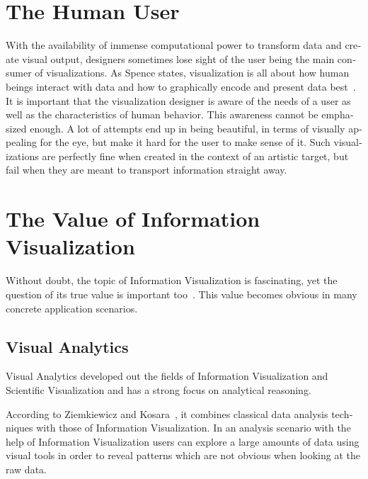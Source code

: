 \begin{english}
\section{The Human User}

With the availability of immense computational power to transform data and create visual output, designers sometimes lose sight of the user being the main consumer of visualizations. As Spence states, visualization is all about how human beings interact with data and how to graphically encode and present data best~\cite{InformationVisualization07}. It is important that the visualization designer is aware of the needs of a user as well as the characteristics of human behavior. This awareness cannot be emphasized enough. A lot of attempts end up in being beautiful, in terms of visually appealing for the eye, but make it hard for the user to make sense of it. Such visualizations are perfectly fine when created in the context of an artistic target, but fail when they are meant to transport information straight away.


\section{The Value of Information Visualization}

Without doubt, the topic of Information Visualization is fascinating, yet the question of its true value is important too~\cite{InformationVisualization07}. This value becomes obvious in many concrete application scenarios.


\subsection{Visual Analytics}

Visual Analytics developed out the fields of Information Visualization and Scientific Visualization and has a strong focus on analytical reasoning.

According to Ziemkiewicz and Kosara~\cite{Ziemkiewicz10}, it combines classical data analysis techniques with those of Information Visualization. In an analysis scenario with the help of Information Visualization users can explore a large amounts of data using visual tools in order to reveal patterns which are not obvious when looking at the raw data.


\end{english}
